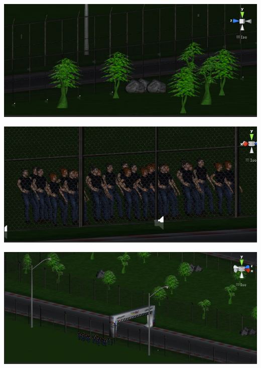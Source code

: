 \begin{center}
	\includegraphics[scale=0.4]{figuras/jardim}
	\label{figura:jardim}
\end{center}


\begin{center}
	\includegraphics[scale=0.4]{figuras/torcida}
	\label{figura:torcida}
\end{center}

\begin{center}
	\includegraphics[scale=0.4]{figuras/visaocima}
	\label{figura:visaodecima}
\end{center}

